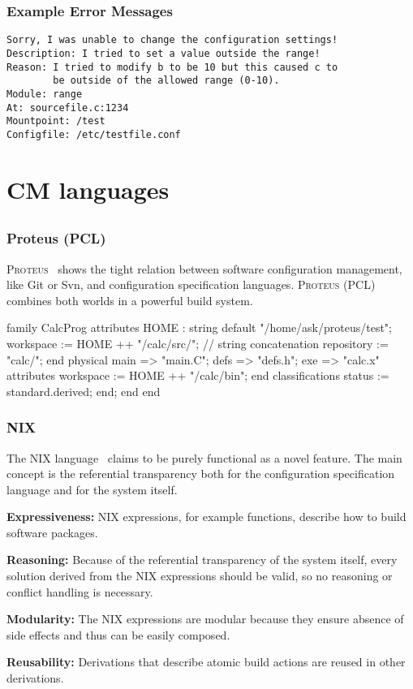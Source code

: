 \begin{frame}[fragile]
	\frametitle{Example Error Messages}
\begin{verbatim}
Sorry, I was unable to change the configuration settings!
Description: I tried to set a value outside the range!
Reason: I tried to modify b to be 10 but this caused c to
        be outside of the allowed range (0-10).
Module: range
At: sourcefile.c:1234
Mountpoint: /test
Configfile: /etc/testfile.conf
\end{verbatim}
\end{frame}



\section{CM languages}

\subsection{}

\begin{frame}[fragile]
	\frametitle{Proteus (PCL)}
	\textsc{Proteus}~\cite{tryggeseth1995modelling} shows the tight relation between software configuration management, like Git or Svn, and configuration specification languages.
	\textsc{Proteus} (PCL) combines both worlds in a powerful build system.

	\begin{code}[basicstyle=\tiny,morekeywords={family,attributes,end,physical,default,classifications},gobble=4,language=]
	family CalcProg
		attributes
			HOME : string default "/home/ask/proteus/test";
			workspace := HOME ++ "/calc/src/"; // string concatenation
			repository := "calc/";
			end
		physical
			main => "main.C";
			defs => "defs.h";
			exe => "calc.x" attributes workspace := HOME ++ "/calc/bin"; end
			classifications status := standard.derived; end;
		end
	end
	\end{code}
\end{frame}

\begin{frame}
	\frametitle{NIX}

	The NIX language~\cite{dolstra2007purely} claims to be purely functional as a novel feature.
	The main concept is the referential transparency both for the configuration specification language and for the system itself.

	\textbf{Expressiveness:}
	NIX expressions, for example functions, describe how to build software packages.

	\textbf{Reasoning:}
	Because of the referential transparency of the system itself, every solution derived from the NIX expressions should be valid, so no reasoning or conflict handling is necessary.

	\textbf{Modularity:}
	The NIX expressions are modular because they ensure absence of side effects and thus can be easily composed.

	\textbf{Reusability:}
	Derivations that describe atomic build actions are reused in other derivations.
\end{frame}

